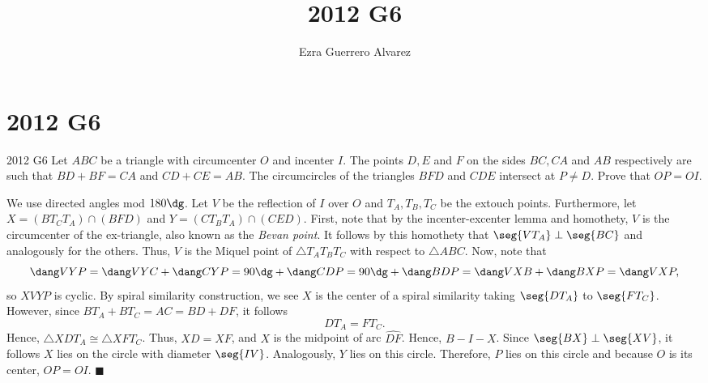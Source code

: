 \documentclass[14pt]{article}
\title{2012 G6}
\author{Ezra Guerrero Alvarez}
\begin{document}
\maketitle
	
\section*{2012 G6}

\begin{statement}{2012 G6}
	Let $ABC$ be a triangle with circumcenter $O$ and incenter $I$. The points $D,E$ and $F$ on the sides $BC,CA$ and $AB$ respectively are such that $BD+BF=CA$ and $CD+CE=AB$. The circumcircles of the triangles $BFD$ and $CDE$ intersect at $P \neq D$. Prove that $OP=OI$.
\end{statement}
We use directed angles mod $180\dg$. Let $V$ be the reflection of $I$ over $O$ and $T_A,T_B,T_C$ be the extouch points. Furthermore, let $X=(BT_CT_A)\cap(BFD)$ and $Y=(CT_BT_A)\cap(CED)$. First, note that by the incenter-excenter lemma and homothety, $V$ is the circumcenter of the ex-triangle, also known as the \emph{Bevan point}. It follows by this homothety that $\seg{VT_A}\perp\seg{BC}$ and analogously for the others. Thus, $V$ is the Miquel point of $\triangle T_AT_BT_C$ with respect to $\triangle ABC$. Now, note that
\[ \dang VYP = \dang VYC + \dang CYP = 90\dg+\dang CDP=90\dg+\dang BDP = \dang VXB + \dang BXP = \dang VXP, \]
so $XVYP$ is cyclic. By spiral similarity construction, we see $X$ is the center of a spiral similarity taking $\seg{DT_A}$ to $\seg{FT_C}$. However, since $BT_A+BT_C=AC=BD+DF$, it follows
\[ DT_A=FT_C. \]
Hence, $\triangle XDT_A\cong\triangle XFT_C$. Thus, $XD=XF$, and $X$ is the midpoint of arc $\widehat{DF}$. Hence, $B-I-X$. Since $\seg{BX}\perp\seg{XV}$, it follows $X$ lies on the circle with diameter $\seg{IV}$. Analogously, $Y$ lies on this circle. Therefore, $P$ lies on this circle and because $O$ is its center, $OP=OI$. $\blacksquare$
	
\end{document}
